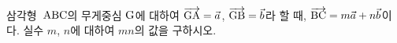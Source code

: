 삼각형~$\mathrm{ABC}$의 무게중심 $\mathrm{G}$에 대하여 $\overrightarrow{\mathrm{GA}}=\vec{a}$, $\overrightarrow{\mathrm{GB}}=\vec{b}$라 할 때, $\overrightarrow{\mathrm{BC}}=m\vec{a}+n\vec{b}$이다. 실수 $m$, $n$에 대하여 $mn$의 값을 구하시오.
